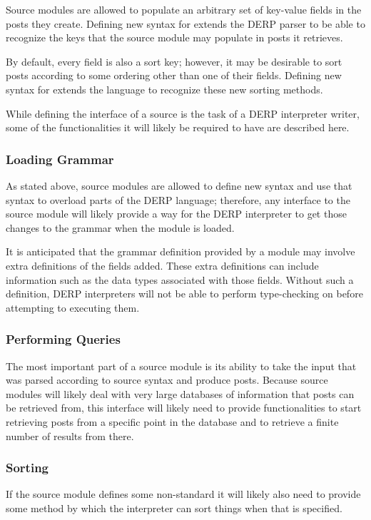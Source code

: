 Source modules are allowed to populate an arbitrary set of key-value fields in the posts
they create. Defining new syntax for  extends the DERP parser to be able to recognize
the keys that the source module may populate in posts it retrieves.

By default, every field is also a sort key; however, it may be desirable to sort posts according
to some ordering other than one of their fields. Defining new syntax for  extends the
language to recognize these new sorting methods.

While defining the interface of a source is the task of a DERP interpreter writer, some of the
functionalities it will likely be required to have are described here.

\subsubsection{Loading Grammar}
As stated above, source modules are allowed to define new syntax and use that syntax to overload parts
of the DERP language; therefore, any interface to the source module will likely provide a way for the
DERP interpreter to get those changes to the grammar when the module is loaded.

It is anticipated that the grammar definition provided by a module may involve extra definitions of
the fields added. These extra definitions can include information such as the data types associated
with those fields. Without such a definition, DERP interpreters will not be able to perform type-checking
on  before attempting to executing them.

\subsubsection{Performing Queries}
The most important part of a source module is its ability to take the input that was parsed according to
source syntax and produce posts. Because source modules will likely deal with very large databases of
information that posts can be retrieved from, this interface will likely need to provide functionalities
to start retrieving posts from a specific point in the database and to retrieve a finite number of results
from there.


\subsubsection{Sorting}
If the source module defines some non-standard  it will likely also need to provide some method by
which the interpreter can sort things when that  is specified.

